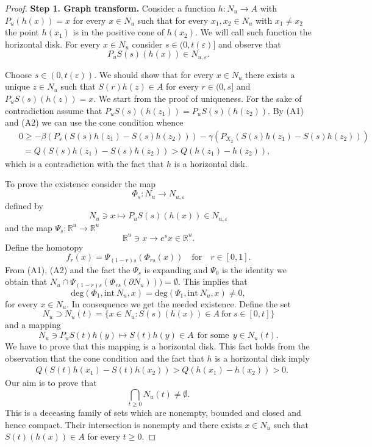 \documentclass[11pt, leqno]{amsart}
\theoremstyle{definition}
\begin{document}
\begin{proof}
	
	\textbf{Step 1. Graph transform.}
	Consider a function  $h:N_u \to A$ with $P_u(h(x)) = x$ for every $x\in N_u$ such that for every $x_1, x_2\in N_u$ with $x_1\neq x_2$ the point $h(x_1)$ is in the positive cone of $h(x_2)$. We will call such function the horizontal disk. For every $x\in N_u$ consider $s\in (0,t(\varepsilon)]$ and observe that
	$$P_u S(s) (h(x)) \in N_{u,\varepsilon}.$$
	
	Choose $s\in (0,t(\varepsilon))$. We should show that for every $ x\in N_u$ there exists a unique $z\in N_u$  such that $S(r)h(z) \in A$ for every $r\in (0,s]$ and $ P_u S(s) (h(z)) = x$.
	We start from the proof of uniqueness. For the sake of contradiction assume that $P_u S(s) (h(z_1)) = P_u S(s) (h(z_2))$. By (A1) and (A2) we can use the cone condition whence
	\begin{align*}
		& \ \ 0 \geq - \beta(P_{s} (S(s)h(z_1)-S(s)h(z_2))) - \gamma(P_{X_2}(S(s)h(z_1)-S(s)h(z_2))) \\
		& \ \ \ \  = Q(S(s)h(z_1)-S(s)h(z_2)) > Q(h(z_1)-h(z_2)),
	\end{align*}
	which is a contradiction with the fact that $h$ is a horizontal disk.
	
	To prove the existence consider the map
	$$
	\Phi_s:N_u\to N_{u,\varepsilon}
	$$
	defined by
	$$
	N_u \ni{x} \mapsto   P_u S(s)(h(x)) \in N_{u,\varepsilon}
	$$
	and the map $\Psi_s:\mathbb{R}^u \to \mathbb{R}^u$
	$$
	\mathbb{R}^u\ni{x} \to e^{s} x \in \mathbb{R}^u.
	$$
	Define the homotopy
	$$
	f_r(x) = \Psi_{(1-r)s}(\Phi_{rs}(x)) \quad \textrm{for}\quad r\in [0,1].
	$$
	From (A1), (A2) and the fact the $\Psi_s$ is expanding and $\Psi_0$ is the identity we obtain that $N_u \cap \Psi_{(1-r)s}(\Phi_{rs}(\partial N_u))) = \emptyset$.
	This implies that
	$$ \mathrm{deg}(\Phi_1,\textrm{int}\ N_u,x) = \mathrm{deg}(\Psi_1,\textrm{int}\ N_u,x) \neq 0,$$
	for every $x\in N_u$. In consequence we get the needed existence.
	Define the set
	$$
	N_u \supset N_u(t) = \{ x \in N_u :  S(s)(h(x)) \in A \ \mathrm{for}\ s\in [0,t]\}
	$$ and a mapping
	$$
	N_u \ni P_u S(t)h(y)  \mapsto S(t)h(y) \in A\ \ \textrm{for some}\ \ y\in N_u(t).
	$$
	We have to prove that this mapping is a horizontal disk. This fact holds from the observation that the cone condition and the fact that $h$ is a horizontal disk imply
	\begin{align*}
		& Q(S(t)h(x_1)-S(t)h(x_2)) > Q(h(x_1)-h(x_2))> 0.
	\end{align*}
	Our aim is to prove that
	$$
	\bigcap_{t\geq 0} N_u(t) \neq \emptyset.
	$$
	This is a deceasing family of sets which are nonempty, bounded and closed and hence compact. Their intersection is nonempty and there exists $x\in N_u$ such that $S(t)(h(x)) \in A$ for every $t\geq 0$.
	

\end{proof}
\end{document}
